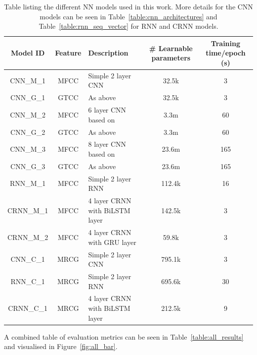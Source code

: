 \begin{table}
\begin{center}
\begin{tabular}{c c l c c}
\toprule
Model ID & Feature & Description & \# Learnable parameters & Training time/epoch (s) \\ [0.5ex]
\midrule
CNN\_M\_1 & MFCC & Simple 2 layer CNN & 32.5k & 3 \\
CNN\_G\_1 & GTCC & As above & 32.5k & 3 \\
CNN\_M\_2 & MFCC & 6 layer CNN based on~\cite{ruff2020automated} & 3.3m & 60 \\
CNN\_G\_2 & GTCC & As above & 3.3m & 60 \\
CNN\_M\_3 & MFCC & 8 layer CNN based on~\cite{kahl2017large} & 23.6m & 165 \\
CNN\_G\_3 & GTCC & As above & 23.6m & 165 \\
RNN\_M\_1 & MFCC & Simple 2 layer RNN & 112.4k & 16 \\
CRNN\_M\_1 & MFCC & 4 layer CRNN with BiLSTM layer & 142.5k & 3 \\
CRNN\_M\_2 & MFCC & 4 layer CRNN with GRU layer & 59.8k & 3 \\
CNN\_C\_1 & MRCG & Simple 2 layer CNN & 795.1k & 3 \\
RNN\_C\_1 & MRCG & Simple 2 layer RNN & 695.6k & 30 \\
CRNN\_C\_1 & MRCG & 4 layer CRNN with BiLSTM layer & 212.5k & 9 \\
\bottomrule
\end{tabular}
\caption{Table listing the different NN models used in this work. More details
for the CNN models can be seen in Table~\ref{table:cnn_architectures} and
Table~\ref{table:rnn_seq_vector} for RNN and CRNN models.}\label{table:nn_models}
\end{center}
\end{table}

A combined table of evaluation metrics can be seen in
Table~\ref{table:all_results} and visualised in Figure~\ref{fig:all_bar}.

